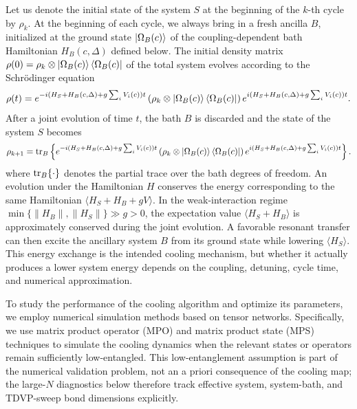 \documentclass[aps,pra,twocolumn,superscriptaddress,nolongbibliography,nobalancelastpage,10pt]{revtex4-2}
\begin{document}
Let us denote the initial state of the system $S$ at the beginning of the $k$-th cycle by $\rho_k$. At the beginning of each cycle, we always bring in a fresh ancilla $B$, initialized at the ground state \(\ket{\Omega_B(c)}\) of the coupling-dependent bath Hamiltonian \(H_B(c,\Delta)\) defined below. The initial density matrix \(\rho(0)=\rho_k\otimes\ket{\Omega_B(c)}\bra{\Omega_B(c)}\) of the total system evolves according to the Schr\"{o}dinger equation
\begin{equation}
	\rho(t) = e^{-i(H_S + H_{B}(c,\Delta) + g\sum_i V_i(c)) t} \left(\rho_k \otimes \ket{\Omega_B(c)}\bra{\Omega_B(c)}\right)  e^{i(H_S + H_{B}(c,\Delta) + g\sum_i V_i(c)) t}.
	\label{eq:rhot}
\end{equation}
After a joint evolution of time $t$, the bath $B$ is discarded and the state of the system $S$ becomes
\begin{equation}
	\rho_{k+1} = \operatorname{tr}_B\left\{ e^{-i(H_S + H_{B}(c,\Delta) + g\sum_i V_i(c)) t} \left(\rho_k \otimes \ket{\Omega_B(c)}\bra{\Omega_B(c)}\right)  e^{i(H_S + H_{B}(c,\Delta) + g\sum_i V_i(c))t} \right\}.
	\label{eq:rhokp1}
\end{equation}
where $\operatorname{tr}_B\{\cdot\}$ denotes the partial trace over the bath degrees of freedom.
An evolution under the Hamiltonian $H$ conserves the energy corresponding to the same Hamiltonian $\langle H_S + H_B + gV\rangle$.
In the weak-interaction regime
\(\min\{\|H_B\|,\|H_S\|\}\gg g>0\), the expectation value
\(\langle H_S+H_B\rangle\) is approximately conserved during the joint
evolution.  A favorable resonant transfer can then excite the ancillary system
\(B\) from its ground state while lowering \(\langle H_S\rangle\).  This energy
exchange is the intended cooling mechanism, but whether it actually produces a
lower system energy depends on the coupling, detuning, cycle time, and
numerical approximation.

To study the performance of the cooling algorithm and optimize its parameters, we employ numerical simulation methods based on tensor networks. Specifically, we use matrix product operator (MPO) and matrix product state (MPS) techniques to simulate the cooling dynamics when the relevant states or operators remain sufficiently low-entangled. This low-entanglement assumption is part of the numerical validation problem, not an a priori consequence of the cooling map; the large-\(N\) diagnostics below therefore track effective system, system-bath, and TDVP-sweep bond dimensions explicitly.
\end{document}
